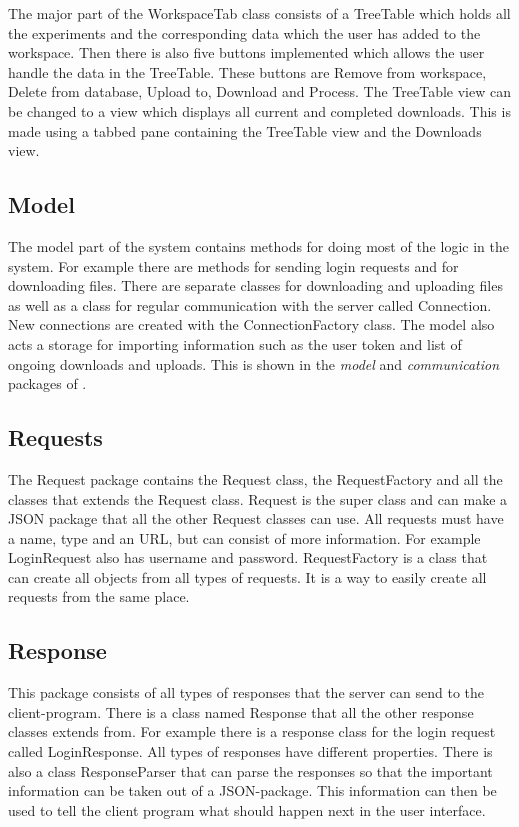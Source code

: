 The major part of the WorkspaceTab class consists of a TreeTable which holds all the experiments and the corresponding data which the user has added to the workspace. Then there is also five buttons implemented which allows the user handle the data in the TreeTable. These buttons are Remove from workspace, Delete from database, Upload to, Download and Process. The TreeTable view can be changed to a view which displays all current and completed downloads. This is made using a tabbed pane containing the TreeTable view and the Downloads view.

\subsection{Model}
The model part of the system contains methods for doing most of the logic in the system. For example there are methods for sending login requests and for downloading files. There are separate classes for downloading and uploading files as well as a class for regular communication with the server called Connection. New connections are created with the ConnectionFactory class. The model also acts a storage for importing information such as the user token and list of ongoing downloads and uploads. This is shown in the \textit{model} and \textit{communication} packages of .

\subsection{Requests}
The Request package contains the Request class, the RequestFactory and all the classes that extends the Request class. Request is the super class and can make a JSON package that all the other Request classes can use. All requests must have a name, type and an URL, but can consist of more information. For example LoginRequest also has username and password. RequestFactory is a class that can create all objects from all types of requests. It is a way to easily create all requests from the same place.


\subsection{Response}
This package consists of all types of responses that the server can send to the client-program. There is a class named Response that all the other response classes extends from. For example there is a response class for the login request called LoginResponse. All types of responses have different properties. There is also a class ResponseParser that can parse the responses so that the important information can be taken out of a JSON-package. This information can then be used to tell the client program what should happen next in the user interface.


